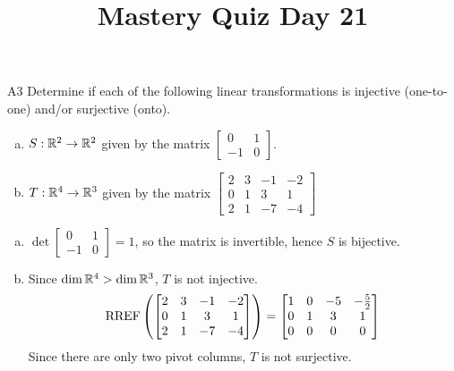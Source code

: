 \documentclass{sbgLAquiz}
\title{Mastery Quiz Day 21 }
\begin{document}
\begin{problem}{A3}
Determine if each of the following linear transformations is injective (one-to-one) and/or surjective (onto).
\begin{enumerate}[(a)]
\item $S: \mathbb{R}^2 \rightarrow \mathbb{R}^2$ given by the matrix $\begin{bmatrix} 0 & 1 \\ -1 & 0 \end{bmatrix}$.
\item $T: \mathbb{R}^4 \rightarrow \mathbb{R}^3$ given by the matrix $\begin{bmatrix} 2 & 3 & -1 & -2 \\ 0 & 1 & 3 & 1 \\ 2 & 1 & -7 & -4 \end{bmatrix}$
\end{enumerate}
\end{problem}
\begin{solution}
\begin{enumerate}[(a)]
\item $\det \begin{bmatrix} 0 & 1 \\ -1 & 0 \end{bmatrix}=1$, so the matrix is invertible, hence $S$ is bijective.
\item Since $\dim \mathbb{R}^4 > \dim \mathbb{R}^3$, $T$ is not injective.
$$\operatorname{RREF}\left(\begin{bmatrix} 2 & 3 & -1 & -2 \\ 0 & 1 & 3 & 1 \\ 2 & 1 & -7 & -4 \end{bmatrix}\right) = \begin{bmatrix} 1 & 0 & -5 & -\frac{5}{2} \\ 0 & 1 & 3 & 1 \\ 0 & 0 & 0 & 0\end{bmatrix}$$
Since there are only two pivot columns, $T$ is not surjective.
\end{enumerate}
\end{solution}
\end{document}
